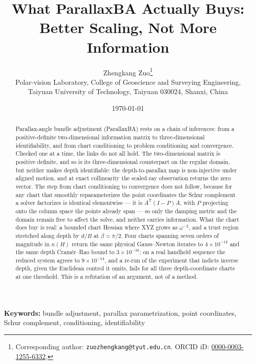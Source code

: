 \documentclass[11pt,a4paper]{article}
\title{What ParallaxBA Actually Buys:\\
Better Scaling, Not More Information}
\author{%
  Zhengkang Zuo\thanks{Corresponding author: \texttt{zuozhengkang@tyut.edu.cn}.
  ORCID iD: \href{https://orcid.org/0000-0003-1255-6332}{0000-0003-1255-6332}.}\\[3pt]
  \normalsize Polar-vision Laboratory, College of Geoscience and Surveying Engineering,\\
  \normalsize Taiyuan University of Technology, Taiyuan 030024, Shanxi, China
}
\date{\today}
\theoremstyle{definition}
\theoremstyle{remark}
\newcommand{\T}{\mathsf{T}}
\begin{document}
\maketitle

\begin{abstract}
Parallax-angle bundle adjustment (ParallaxBA) rests on a chain of inferences: from a positive-definite two-dimensional information matrix to three-dimensional identifiability, and from chart conditioning to problem conditioning and convergence. Checked one at a time, the links do not all hold. The two-dimensional matrix is positive definite, and so is its three-dimensional counterpart on the regular domain, but neither makes depth identifiable: the depth-to-parallax map is non-injective under aligned motion, and at exact collinearity the scaled-ray observation returns the zero vector. The step from chart conditioning to convergence does not follow, because for any chart that smoothly reparameterizes the point coordinates the Schur complement a solver factorizes is identical elementwise --- it is $A^{\T}(I-P)A$, with $P$ projecting onto the column space the points already span --- so only the damping metric and the domain remain free to affect the solve, and neither carries information. What the chart does buy is real: a bounded chart Hessian where XYZ grows as $\omega^{-2}$, and a trust region stretched along depth by $d/B$ at $\beta=\pi/2$. Four charts spanning seven orders of magnitude in $\kappa(H)$ return the same physical Gauss--Newton iterates to $4\times10^{-14}$ and the same depth Cram\'er--Rao bound to $3\times10^{-10}$; on a real handheld sequence the reduced system agrees to $9\times10^{-14}$, and a re-run of the experiment that indicts inverse depth, given the Euclidean control it omits, fails for all three depth-coordinate charts at one threshold. This is a refutation of an argument, not of a method.
\end{abstract}

\vspace{0.6em}
\noindent\textbf{Keywords:} bundle adjustment, parallax parametrization, point coordinates, Schur complement, conditioning, identifiability
\end{document}
